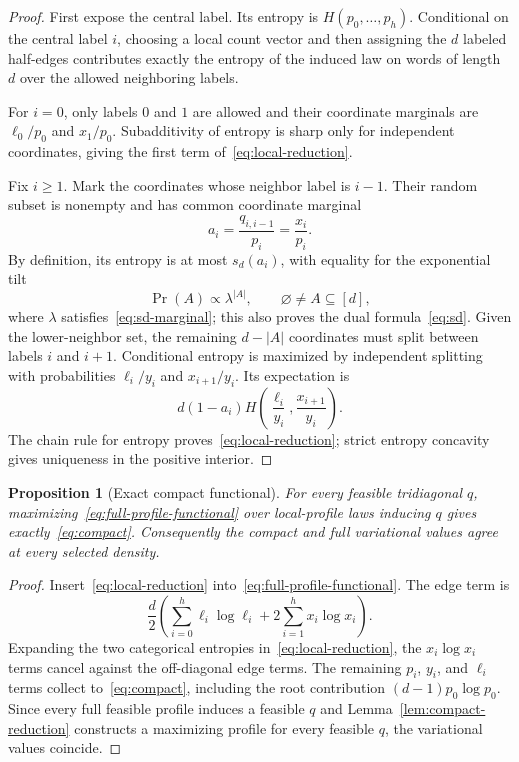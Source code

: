 \documentclass[11pt]{amsart}
\newtheorem{proposition}[theorem]{Proposition}
\theoremstyle{definition}
\begin{document}
\begin{proof}
First expose the central label.  Its entropy is $H(p_0,\ldots,p_h)$.  Conditional on the central label $i$, choosing a local count vector and then assigning the $d$ labeled half-edges contributes exactly the entropy of the induced law on words of length $d$ over the allowed neighboring labels.

For $i=0$, only labels $0$ and $1$ are allowed and their coordinate marginals are $\ell_0/p_0$ and $x_1/p_0$.  Subadditivity of entropy is sharp only for independent coordinates, giving the first term of~\eqref{eq:local-reduction}.

Fix $i\ge1$.  Mark the coordinates whose neighbor label is $i-1$.  Their random subset is nonempty and has common coordinate marginal
\[
 a_i=\frac{q_{i,i-1}}{p_i}=\frac{x_i}{p_i}.
\]
By definition, its entropy is at most $s_d(a_i)$, with equality for the exponential tilt
\[
 \Pr(A)\propto \lambda^{|A|},\qquad \varnothing\ne A\subseteq[d],
\]
where $\lambda$ satisfies~\eqref{eq:sd-marginal}; this also proves the dual formula~\eqref{eq:sd}.  Given the lower-neighbor set, the remaining $d-|A|$ coordinates must split between labels $i$ and $i+1$.  Conditional entropy is maximized by independent splitting with probabilities $\ell_i/y_i$ and $x_{i+1}/y_i$.  Its expectation is
\[
 d(1-a_i)H\!\left(\frac{\ell_i}{y_i},\frac{x_{i+1}}{y_i}\right).
\]
The chain rule for entropy proves~\eqref{eq:local-reduction}; strict entropy concavity gives uniqueness in the positive interior.
\end{proof}

\begin{proposition}[Exact compact functional]\label{prop:exact-compact}
For every feasible tridiagonal $q$, maximizing~\eqref{eq:full-profile-functional} over local-profile laws inducing $q$ gives exactly~\eqref{eq:compact}.  Consequently the compact and full variational values agree at every selected density.
\end{proposition}

\begin{proof}
Insert~\eqref{eq:local-reduction} into~\eqref{eq:full-profile-functional}.  The edge term is
\[
 \frac d2\left(\sum_{i=0}^h\ell_i\log\ell_i+2\sum_{i=1}^h x_i\log x_i\right).
\]
Expanding the two categorical entropies in~\eqref{eq:local-reduction}, the $x_i\log x_i$ terms cancel against the off-diagonal edge terms.  The remaining $p_i$, $y_i$, and $\ell_i$ terms collect to~\eqref{eq:compact}, including the root contribution $(d-1)p_0\log p_0$.  Since every full feasible profile induces a feasible $q$ and Lemma~\ref{lem:compact-reduction} constructs a maximizing profile for every feasible $q$, the variational values coincide.
\end{proof}
\end{document}
